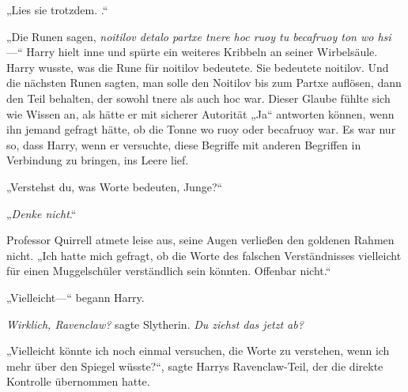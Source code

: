 „Lies sie trotzdem. .“

„Die Runen sagen, \emph{noitilov detalo partxe tnere hoc ruoy tu becafruoy ton wo hsi}—“ Harry hielt inne und spürte ein weiteres Kribbeln an seiner Wirbelsäule.
Harry wusste, was die Rune für noitilov bedeutete. Sie bedeutete noitilov. Und die nächsten Runen sagten, man solle den Noitilov bis zum Partxe auflösen, dann den Teil behalten, der sowohl tnere als auch hoc war. Dieser Glaube fühlte sich wie Wissen an, als hätte er mit sicherer Autorität „Ja“ antworten können, wenn ihn jemand gefragt hätte, ob die Tonne wo ruoy oder becafruoy war. Es war nur so, dass Harry, wenn er versuchte, diese Begriffe mit anderen Begriffen in Verbindung zu bringen, ins Leere lief.

„Verstehst du, was Worte bedeuten, Junge?“

„\emph{Denke nicht}.“

Professor Quirrell atmete leise aus, seine Augen verließen den goldenen Rahmen nicht. „Ich hatte mich gefragt, ob die Worte des falschen Verständnisses vielleicht für einen Muggelschüler verständlich sein könnten. Offenbar nicht.“

„Vielleicht—“ begann Harry.

\emph{Wirklich, Ravenclaw?} sagte Slytherin. \emph{Du ziehst das \emph{jetzt} ab?}

„Vielleicht könnte ich noch einmal versuchen, die Worte zu verstehen, wenn ich mehr über den Spiegel wüsste?“, sagte Harrys Ravenclaw-Teil, der die direkte Kontrolle übernommen hatte.

